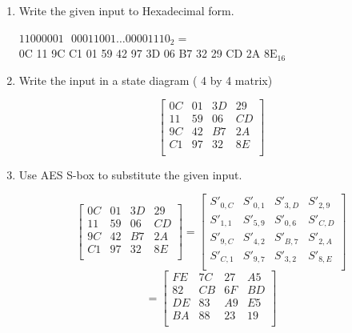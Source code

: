 \documentclass[12pt]{article}
\newenvironment{answer}
{ \begin{tcolorbox}[halign=left]
    }
    {  
  \end{tcolorbox}
}
\begin{document}
\begin{enumerate}
  \begin{enumerate}
    \item Write the given input to Hexadecimal form.
      \begin{answer}
        $11000001\text{ }00011001 \ldots 00001110_{2} = $ \\
        0C 11 9C C1 01 59 42 97 3D 06 B7 32 29 CD 2A 8$\text{E}_{16} $
      \end{answer}
    \item Write the input in a state diagram ( 4 by 4 matrix)
      \begin{answer}
        \[ 
          \begin{bmatrix}
            0C & 01 & 3D & 29 \\
            11 & 59 & 06 & CD \\
            9C & 42 & B7 & 2A \\
            C1 & 97 & 32 & 8E \\
          \end{bmatrix}
        \]
      \end{answer}
    \item Use AES S-box to substitute the given input.
      \begin{answer}
        \[ 
          \begin{bmatrix}
            0C & 01 & 3D & 29 \\
            11 & 59 & 06 & CD \\
            9C & 42 & B7 & 2A \\
            C1 & 97 & 32 & 8E \\
          \end{bmatrix}
          =
          \begin{bmatrix}
            S'_{0,C} & S'_{0,1} & S'_{3,D} & S'_{2,9} \\
            S'_{1,1} & S'_{5,9} & S'_{0,6} & S'_{C,D} \\
            S'_{9,C} & S'_{4,2} & S'_{B,7} & S'_{2,A} \\
            S'_{C,1} & S'_{9,7} & S'_{3,2} & S'_{8,E} \\
          \end{bmatrix}
          \] 
          \[ 
            =
          \begin{bmatrix}
            FE & 7C & 27 & A5 \\
            82 & CB & 6F & BD \\
            DE & 83 & A9 & E5 \\
            BA & 88 & 23 & 19 \\
          \end{bmatrix}
        \]
      \end{answer}
  \end{enumerate}
  

\end{enumerate}
\end{document}
